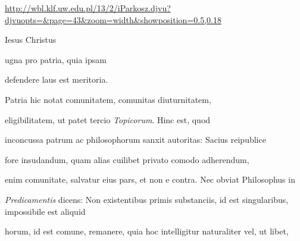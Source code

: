 \url{http://wbl.klf.uw.edu.pl/13/2/iParkosz.djvu?djvuopts=&page=43&zoom=width&showposition=0.5,0.18}




\renewcommand{\theFancyVerbLine}{03-0\arabic{FancyVerbLine}\phantom{a}}

\begin{VerbatimLatin}
Iesus Christus{\color{red}\footnotemark[1]}

ugna pro patria, quia ipsam

defendere laus est meritoria.{\color{red}\footnotemark[2]}
\end{VerbatimLatin}
\begin{VerbatimLatin}[firstnumber=last]
  
Patria hic notat comunitatem, comunitas diuturnitatem, 

 eligibilitatem, ut patet tercio \textit{Topicorum}{\color{red}\footnotemark[3]}. Hinc est, quod

inconcussa patrum ac philosophorum sanxit autoritas: Sacius reipublice

fore insudandum, quam alias cuilibet privato comodo adherendum, 

 enim comunitate, salvatur eius pars, et non e contra. Nec obviat Philosophus in

\textit{Predicamentis} dicens: Non existentibus primis substanciis, id est singularibus, impossibile est aliquid
\end{VerbatimLatin}
\renewcommand{\theFancyVerbLine}{03-\arabic{FancyVerbLine}\phantom{a}}
\begin{VerbatimLatin}[firstnumber=last]
horum, id est comune, remanere{\color{red}\footnotemark[4]}, quia hoc intelligitur naturaliter vel, ut libet,
\end{VerbatimLatin}



